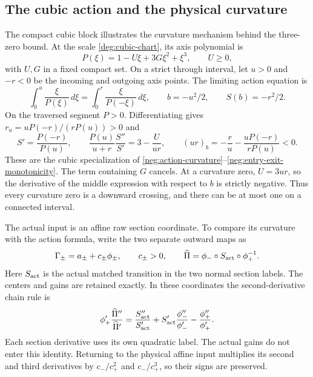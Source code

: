 \subsection{The cubic action and the physical curvature}
\label{subsec:representative-cubic}

The compact cubic block illustrates the curvature mechanism behind the
three-zero bound. At the scale \eqref{deg:cubic-chart}, its axis
polynomial is
\[
 P(\xi)=1-U\xi+3G\xi^2+\xi^3,
 \qquad U\ge0,
\]
with \(U,G\) in a fixed compact set. On a strict through interval,
let \(u>0\) and \(-r<0\) be the incoming and outgoing axis points.
The limiting action equation is
\begin{equation}\label{intro:compact-action}
 \int_0^u\frac{\xi}{P(\xi)}\,d\xi
 =\int_0^r\frac{\xi}{P(-\xi)}\,d\xi,
 \qquad b=-u^2/2,\qquad S(b)=-r^2/2.
\end{equation}
On the traversed segment \(P>0\). Differentiating gives
\(r_u=uP(-r)/(rP(u))>0\) and
\begin{equation}\label{intro:compact-action-curvature}
 S'=\frac{P(-r)}{P(u)},\qquad
 \frac{P(u)}{u+r}\frac{S''}{S'}=3-\frac{U}{ur},\qquad
 (ur)_b=-\frac ru-\frac{uP(-r)}{rP(u)}<0.
\end{equation}
These are the cubic specialization of
\eqref{neg:action-curvature}--\eqref{neg:entry-exit-monotonicity}.
The term containing \(G\) cancels. At a curvature zero, \(U=3ur\),
so the derivative of the middle expression with respect to \(b\)
is strictly negative. Thus every curvature zero is a downward crossing,
and there can be at most one on a connected interval.

The actual input is an affine raw section coordinate. To compare its
curvature with the action formula, write the two separate outward maps as
\[
 \Gamma_\pm=a_\pm+c_\pm\phi_\pm,\qquad c_\pm>0,
 \qquad \widehat\Pi=\phi_-\circ S_{\rm act}\circ\phi_+^{-1}.
\]
Here \(S_{\rm act}\) is the actual matched transition in the two normal
section labels. The centers and gains are retained exactly. In these
coordinates the second-derivative chain rule is
\begin{equation}\label{intro:completed-curvature-chain}
 \phi_+'\frac{\widehat\Pi''}{\widehat\Pi'}
 =\frac{S_{\rm act}''}{S_{\rm act}'}
  +S_{\rm act}'\frac{\phi_-''}{\phi_-'}
  -\frac{\phi_+''}{\phi_+'}.
\end{equation}
Each section derivative uses its own quadratic label. The actual gains
do not enter this identity. Returning to the physical affine input
multiplies its second and third derivatives by
\(c_-/c_+^2\) and \(c_-/c_+^3\), so their signs are preserved.

